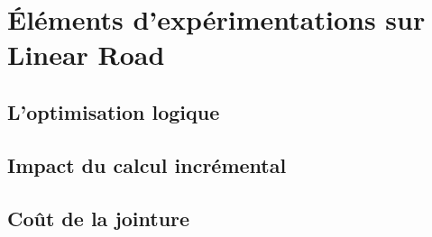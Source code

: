 \section{Éléments d'expérimentations sur Linear Road}\label{sec:valid:perfs:flux}
\subsection{L'optimisation logique}
\subsection{Impact du calcul incrémental}
\subsection{Coût de la jointure}
